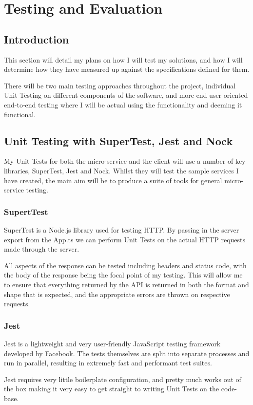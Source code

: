 \chapter{Testing and Evaluation}
\section{Introduction}

This section will detail my plans on how I will test my solutions, and how I will determine how they have measured up against the specifications defined for them.

There will be two main testing approaches throughout the project, individual Unit Testing on different components of the software, and more end-user oriented end-to-end testing where I will be actual using the functionality and deeming it functional. 
\section{Unit Testing with SuperTest, Jest and Nock}

My Unit Tests for both the micro-service and the client will use a number of key libraries, SuperTest, Jest and Nock. Whilst they will test the sample services I have created, the main aim will be to produce a suite of tools for general micro-service testing.
\subsection{SupertTest}
SuperTest is a Node.js library used for testing HTTP. By passing in the server export from the App.ts we can perform Unit Tests on the actual HTTP requests made through the server.

All aspects of the response can be tested including headers and status code, with the body of the response being the focal point of my testing. This will allow me to ensure that everything returned by the API is returned in both the format and shape that is expected, and the appropriate errors are thrown on respective requests.
\subsection{Jest}
Jest is a lightweight and very user-friendly JavaScript testing framework developed by Facebook. The tests themselves are split into separate processes and run in parallel, resulting in extremely fast and performant test suites.

Jest requires very little boilerplate configuration, and pretty much works out of the box making it very easy to get straight to writing Unit Tests on the code-base.

